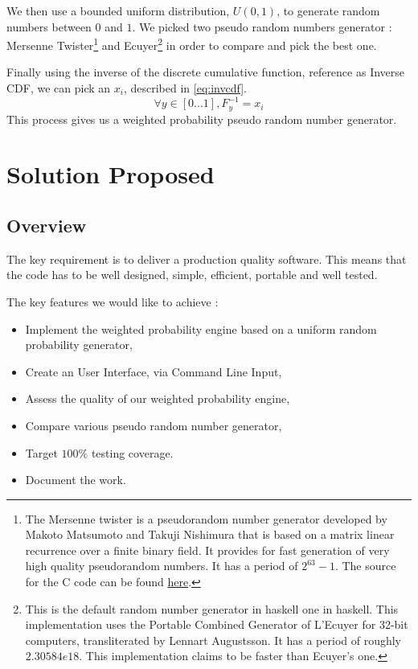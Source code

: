\documentclass[12pt,a4paper,article]{memoir} %
\begin{document}
We then use a bounded uniform distribution, $U\left(0,1\right)$,
to generate random numbers between $0$ and $1$.
We picked two pseudo random numbers generator : Mersenne Twister\footnote{
The Mersenne twister is a pseudorandom number generator developed by 
Makoto Matsumoto and Takuji Nishimura that is based on a matrix linear 
recurrence over a finite binary field. It provides for fast generation of 
very high quality pseudorandom numbers. 
It has a period of $2^63-1$.
The source for the C code can be found 
\href{http://www.math.sci.hiroshima-u.ac.jp/~m-mat/MT/emt64.html}{here}.
} and Ecuyer\footnote{
This is the default random number generator in haskell one in haskell.
 This implementation uses the Portable Combined Generator of L'Ecuyer
 for 32-bit computers, transliterated by Lennart Augustsson. 
 It has a period of roughly $2.30584e18$.
 This implementation claims to be faster than Ecuyer's one.
 } in order to compare and pick the best one.

Finally using the inverse of the discrete cumulative function, reference as Inverse CDF, 
we can pick an $x_i$, described in \autoref{eq:invcdf}.
\begin{equation}
	\forall y \in \left[0...1 \right], F^{-1}_y = x_i
	\label{eq:invcdf}
\end{equation}
This process gives us a weighted probability pseudo random number generator.

\section{Solution Proposed}
\subsection{Overview}

The key requirement is to deliver a production quality software.
This means that the code has to be well designed, simple, 
efficient, portable and well tested.

The key features we would like to achieve :
\begin{itemize}
	\item Implement the weighted probability engine based
	on a uniform random probability generator,
	\item Create an User Interface, via Command Line Input,
	\item Assess the quality of our weighted probability engine,
	\item Compare various pseudo random number generator,
	\item Target $100\%$ testing coverage.
	\item Document the work.
\end{itemize}
\end{document}
